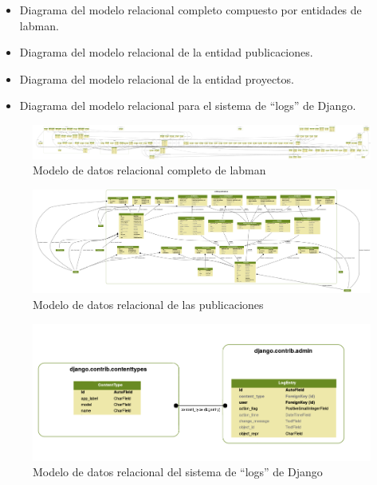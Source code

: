 \begin{itemize}
	\item Diagrama del modelo relacional completo compuesto por entidades de \acrshort{labman}.
	\item Diagrama del modelo relacional de la entidad publicaciones.
	\item Diagrama del modelo relacional de la entidad proyectos.
	\item Diagrama del modelo relacional para el sistema de ``logs'' de Django.
\end{itemize}

\begin{figure}[!htbp]
	\centering
	\includegraphics[angle=-90, scale=0.072]{fig/dbmodel/labman_model}
	\caption{Modelo de datos relacional completo de \acrshort{labman}}
	\label{fig:labmanmodel}
\end{figure}

\begin{figure}[!htbp]
	\centering
	\includegraphics[angle=-90, scale=0.17]{fig/dbmodel/publications}
	\caption{Modelo de datos relacional de las publicaciones}
	\label{fig:publicationsmodel}
\end{figure}

\begin{figure}[!htbp]
	\centering
	\includegraphics[scale=0.5]{fig/dbmodel/django_log}
	\caption{Modelo de datos relacional del sistema de ``logs'' de Django}
	\label{fig:logsmodel}
\end{figure}

